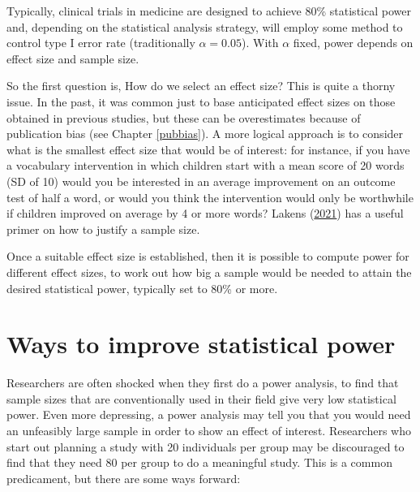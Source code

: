 \documentclass{krantz}
\begin{document}
Typically, clinical trials in medicine are designed to achieve 80\% statistical power and, depending on the statistical analysis strategy, will employ some method to control type I error rate (traditionally \(\alpha=0.05\)). With \(\alpha\) fixed, power depends on effect size and sample size.

So the first question is, How do we select an effect size? This is quite a thorny issue. In the past, it was common just to base anticipated effect sizes on those obtained in previous studies, but these can be overestimates because of publication bias (see Chapter \ref{pubbias}). A more logical approach is to consider what is the smallest effect size that would be of interest: for instance, if you have a vocabulary intervention in which children start with a mean score of 20 words (SD of 10) would you be interested in an average improvement on an outcome test of half a word, or would you think the intervention would only be worthwhile if children improved on average by 4 or more words? Lakens (\protect\hyperlink{ref-lakens2021}{2021}) has a useful primer on how to justify a sample size.

Once a suitable effect size is established, then it is possible to compute power for different effect sizes, to work out how big a sample would be needed to attain the desired statistical power, typically set to 80\% or more.

\hypertarget{ways-to-improve-statistical-power}{%
\section{Ways to improve statistical power}\label{ways-to-improve-statistical-power}}

Researchers are often shocked when they first do a power analysis, to find that sample sizes that are conventionally used in their field give very low statistical power. Even more depressing, a power analysis may tell you that you would need an unfeasibly large sample in order to show an effect of interest. Researchers who start out planning a study with 20 individuals per group may be discouraged to find that they need 80 per group to do a meaningful study. This is a common predicament, but there are some ways forward:
\end{document}
